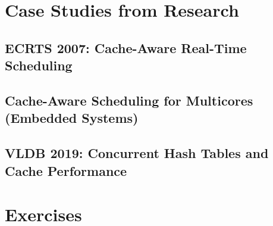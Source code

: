 \section{Case Studies from Research}
\subsection{ECRTS 2007: Cache-Aware Real-Time Scheduling}
\subsection{Cache-Aware Scheduling for Multicores (Embedded Systems)}
\subsection{VLDB 2019: Concurrent Hash Tables and Cache Performance}

\section{Exercises}